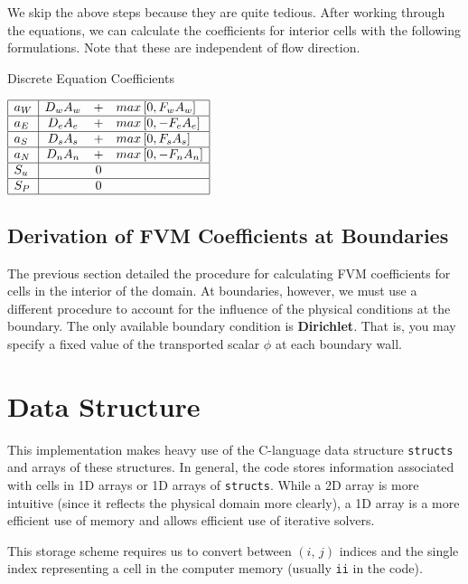 \documentclass{article}
\newcommand{\DA}[1]{D_{#1} A_{#1}}
\newcommand{\FA}[1]{F_{#1} A_{#1}}
\begin{document}
We skip the above steps because they are quite tedious. After working through the equations, we can calculate the coefficients for interior cells with the following formulations. Note that these are independent of flow direction.

\begin{table}[!ht]
\caption{Discrete Equation Coefficients}
\centering
$\begin{array}{|l|ccl|} \hline
   a_W & \DA{w} &+& max\left[0,  \FA{w}\right] \\ \hline
   a_E & \DA{e} &+& max\left[0, -\FA{e}\right] \\ \hline
   a_S & \DA{s} &+& max\left[0,  \FA{s}\right] \\ \hline
   a_N & D_n A_n &+& max\left[0, -F_n A_n\right] \\ \hline
   S_u & & 0 & \\ \hline
   S_P & & 0 & \\ \hline
\end{array}$
\label{tab:coeffs}
\end{table}

\subsection{Derivation of FVM Coefficients at Boundaries}

The previous section detailed the procedure for calculating FVM coefficients for cells in the interior of the domain. At boundaries, however, we must use a different procedure to account for the influence of the physical conditions at the boundary. The only available boundary condition is \textbf{Dirichlet}. That is, you may specify a fixed value of the transported scalar $\phi$ at each boundary wall. 

\section{Data Structure}
This implementation makes heavy use of the C-language data structure \verb|structs| and arrays of these structures. In general, the code stores information associated with cells in 1D arrays or 1D arrays of \texttt{structs}. While a 2D array is more intuitive (since it reflects the physical domain more clearly), a 1D array is a more efficient use of memory and allows efficient use of iterative solvers.

This storage scheme requires us to convert between $(i,\,j)$ indices and the single index representing a cell in the computer memory (usually \texttt{ii} in the code).
\end{document}
